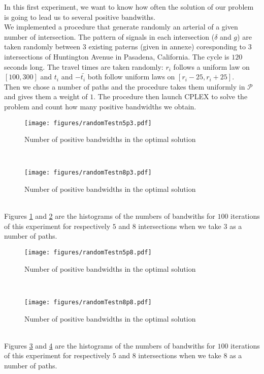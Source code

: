 In this first experiment, we want to know how often the solution of our problem is going to lead us to several positive bandwiths.\\
We implemented a procedure that generate randomly an arterial of a given number of intersection. The pattern of signals in each intersection ($\delta$ and $g$) are taken randomly between 3 existing paterns (given in annexe) coresponding to 3 intersections of Huntington Avenue in Pasadena, California. The cycle is $120$ seconds long. The travel times are taken randomly: $r_i$ follows a uniform law on $[100, 300]$ and $t_i$ and $-\bar{t_i}$ both follow uniform laws on $[r_i-25, r_i+25]$.\\
Then we chose a number of paths and the procedure takes them uniformly in $\mathcal{P}$ and gives them a weight of $1$. The procedure then launch CPLEX to solve the problem and count how many positive bandwidths we obtain. \\
\begin{figure}[!h]
\centering
\texttt{[image: figures/randomTestn5p3.pdf]}
\caption{Number of positive bandwidths in the optimal solution}
\label{rtn5p3}
\end{figure}\\
\begin{figure}[!h]
\centering
\texttt{[image: figures/randomTestn8p3.pdf]}
\caption{Number of positive bandwidths in the optimal solution}
\label{rtn8p3}
\end{figure}\\
Figures \ref{rtn5p3} and \ref{rtn8p3} are the histograms of the numbers of bandwiths for $100$ iterations of this experiment for respectively $5$ and $8$ intersections when we take $3$ as a number of paths.\\
\begin{figure}[!h]
\centering
\texttt{[image: figures/randomTestn5p8.pdf]}
\caption{Number of positive bandwidths in the optimal solution}
\label{rtn5p8}
\end{figure}\\
\begin{figure}[!h]
\centering
\texttt{[image: figures/randomTestn8p8.pdf]}
\caption{Number of positive bandwidths in the optimal solution}
\label{rtn8p8}
\end{figure}\\
Figures \ref{rtn5p8} and \ref{rtn8p8} are the histograms of the numbers of bandwiths for $100$ iterations of this experiment for respectively $5$ and $8$ intersections when we take $8$ as a number of paths. \\